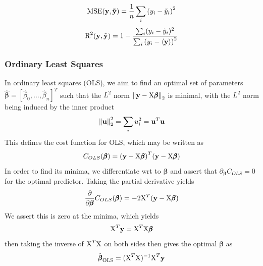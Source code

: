 \documentclass[reprint, english, nofootinbib]{revtex4-2}
\begin{document}
        \begin{equation}
            \textup{MSE}(\mathbf y, \mathbf{\tilde y}) = \frac{1}{n}\sum_i \qty(y_i - \tilde y_i)^2
        \end{equation}
        \begin{equation}
            \textup{R}^2(\mathbf y, \tilde{\mathbf{y}}) = 1 -
            \frac{\sum_i(y_i - \tilde y_i)^2}{\sum_i \qty(y_i - \langle \mathbf y\rangle)^2}
        \end{equation}

        \subsubsection{Ordinary Least Squares}
            \noindent
            In ordinary least squares (OLS), we aim to find an optimal set of parameters $\pmb{\hat\beta} = [\hat\beta_0, \dots, \hat\beta_n]^T$ such that the $L^2$ norm $\norm{\mathbf y - \textup{X}\pmb{\beta}}_2$ is minimal, with the $L^2$ norm being induced by the inner product
            \begin{equation}
                \norm{\mathbf u}_2^2 = \sum_i u_i^2 = \mathbf u^T \mathbf u
            \end{equation}
            This defines the cost function for OLS, which may be written as
            \begin{equation}
                C_{OLS}(\pmb \beta)
                = \qty(\mathbf y - \textup{X}\pmb \beta)^T(\mathbf y - \textup{X}\pmb \beta)
            \end{equation}
            In order to find its minima, we differentiate wrt to $\pmb\beta$ and assert that $\partial_{\pmb\beta}C_{OLS} = 0$ for the optimal predictor. Taking the partial derivative yields
            \begin{align}
                \begin{split}
                \pdv{\pmb\beta}C_{OLS}(\pmb\beta) = -2\textup{X}^T\qty(\mathbf y - \textup X\pmb \beta)
                \end{split}
            \end{align}
            We assert this is zero at the minima, which yields
            \begin{equation}
                \textup{X}^T\mathbf y = \textup{X}^T\textup{X}\pmb\beta
            \end{equation}
            then taking the inverse of $\textup{X}^T\textup{X}$ on both sides then gives the optimal $\pmb\beta$ as
            \begin{equation}\label{eqn:OLS optimal beta}
                \hat{\pmb \beta}_{\textup{OLS}} = (\textup{X}^T\textup{X})^{-1}\textup{X}^T\mathbf y
            \end{equation}
\end{document}
